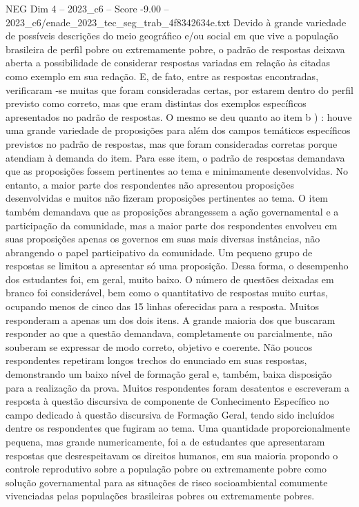 \begin{textsample}{NEG Dim 4 – 2023\_c6 – Score -9.00 – 2023\_c6/enade\_2023\_tec\_seg\_trab\_4f8342634e.txt}
Devido à grande variedade de possíveis descrições do meio geográfico e/ou social em que vive a população brasileira de perfil pobre ou extremamente pobre, o padrão de respostas deixava aberta a possibilidade de considerar respostas variadas em relação às citadas como exemplo em sua redação.
E, de fato, entre as respostas encontradas, verificaram -se muitas que foram consideradas certas, por estarem dentro do perfil previsto como correto, mas que eram distintas dos exemplos específicos apresentados no padrão de respostas.
O mesmo se deu quanto ao item b ) : houve uma grande variedade de proposições para além dos campos temáticos específicos previstos no padrão de respostas, mas que foram consideradas corretas porque atendiam à demanda do item.
Para esse item, o padrão de respostas demandava que as proposições fossem pertinentes ao tema e minimamente desenvolvidas.
No entanto, a maior parte dos respondentes não apresentou proposições desenvolvidas e muitos não fizeram proposições pertinentes ao tema.
O item também demandava que as proposições abrangessem a ação governamental e a participação da comunidade, mas a maior parte dos respondentes envolveu em suas proposições apenas os governos em suas mais diversas instâncias, não abrangendo o papel participativo da comunidade.
Um pequeno grupo de respostas se limitou a apresentar só uma proposição.
Dessa forma, o desempenho dos estudantes foi, em geral, muito baixo.
O número de questões deixadas em branco foi considerável, bem como o quantitativo de respostas muito curtas, ocupando menos de cinco das 15 linhas oferecidas para a resposta.
Muitos responderam a apenas um dos dois itens.
A grande maioria dos que buscaram responder ao que a questão demandava, completamente ou parcialmente, não souberam se expressar de modo correto, objetivo e coerente.
Não poucos respondentes repetiram longos trechos do enunciado em suas respostas, demonstrando um baixo nível de formação geral e, também, baixa disposição para a realização da prova.
Muitos respondentes foram desatentos e escreveram a resposta à questão discursiva de componente de Conhecimento Específico no campo dedicado à questão discursiva de Formação Geral, tendo sido incluídos dentre os respondentes que fugiram ao tema.
Uma quantidade proporcionalmente pequena, mas grande numericamente, foi a de estudantes que apresentaram respostas que desrespeitavam os direitos humanos, em sua maioria propondo o controle reprodutivo sobre a população pobre ou extremamente pobre como solução governamental para as situações de risco socioambiental comumente vivenciadas pelas populações brasileiras pobres ou extremamente pobres.

\end{textsample}
